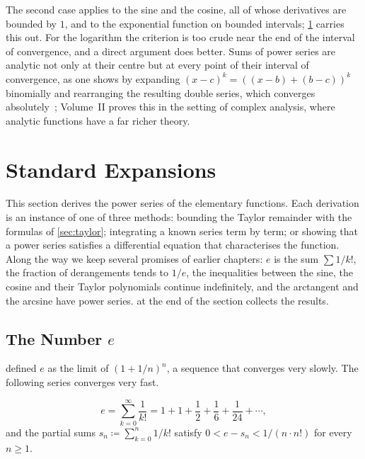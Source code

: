 The second case applies to the sine and the cosine, all of whose derivatives are bounded by $1$, and to the exponential function on bounded intervals; \cref{sec:expansions} carries this out. For the logarithm the criterion is too crude near the end of the interval of convergence, and a direct argument does better. Sums of power series are analytic not only at their centre but at every point of their interval of convergence, as one shows by expanding $(x-c)^k=((x-b)+(b-c))^k$ binomially and rearranging the resulting double series, which converges absolutely~\cite{krantz2002primer}; Volume~II proves this in the setting of complex analysis, where analytic functions have a far richer theory.

\section{Standard Expansions}
\label{sec:expansions}

This section derives the power series of the elementary functions. Each derivation is an instance of one of three methods: bounding the Taylor remainder with the formulas of \cref{sec:taylor}; integrating a known series term by term; or showing that a power series satisfies a differential equation that characterises the function. Along the way we keep several promises of earlier chapters: $e$ is the sum $\sum1/k!$, the fraction of derangements tends to $1/e$, the inequalities between the sine, the cosine and their Taylor polynomials continue indefinitely, and the arctangent and the arcsine have power series.  at the end of the section collects the results.

\subsection{The Number \texorpdfstring{$e$}{e}}

 defined $e$ as the limit of $(1+1/n)^n$, a sequence that converges very slowly. The following series converges very fast.

\begin{theorem}
\label{thm:e-series}
\[
e=\sum_{k=0}^\infty\frac1{k!}=1+1+\frac12+\frac16+\frac1{24}+\cdots ,
\]
and the partial sums $s_n\coloneqq\sum_{k=0}^n1/k!$ satisfy $0<e-s_n<1/(n\cdot n!)$ for every $n\ge1$.
\end{theorem}

